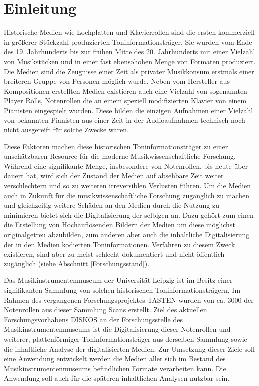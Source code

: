 \section{Einleitung}

Historische Medien wie Lochplatten und Klavierrollen sind die ersten kommerziell in größerer Stückzahl produzierten Toninformationsträger.
Sie wurden vom Ende des 19. Jahrhunderts bis zur frühen Mitte des 20. Jahrhunderts mit einer Vielzahl von Musikstücken und in einer fast ebensohohen Menge von Formaten produziert.
Die Medien sind die Zeugnisse einer Zeit als privater Musikkonsum erstmals einer breiteren Gruppe von Personen möglich wurde.
Neben vom Hersteller aus Kompositionen erstellten Medien existieren auch eine Vielzahl von sogenannten Player Rolls, Notenrollen die an einem speziell modifizierten Klavier von einem Pianisten eingespielt wurden.
Diese bilden die einzigen Aufnahmen einer Vielzahl von bekannten Pianisten aus einer Zeit in der Audioaufnahmen technisch noch nicht ausgereift für solche Zwecke waren.

Diese Faktoren machen diese historischen Toninformationsträger zu einer unschätzbaren Resource für die moderne Musikwissenschaftliche Forschung.\\
Während eine signifikante Menge, insbesondere von Notenrollen, bis heute über-dauert hat, wird sich der Zustand der Medien auf 
absehbare Zeit weiter verschlechtern und so zu weiteren irreversiblen Verlusten führen.
Um die Medien auch in Zukunft für die musikwissenschaftliche Forschung zugänglich zu machen und gleichzeitig weitere Schäden an den Medien durch die Nutzung zu minimieren bietet sich die Digitalisierung der selbigen an.
Dazu gehört zum einen die Erstellung von Hochauflösenden Bildern der Medien um diese möglichst originalgetreu abzubilden, zum anderen aber auch die inhaltliche Digitalisierung der in den Medien kodierten Toninformationen.
Verfahren zu diesem Zweck existieren, sind aber zu meist schlecht dokumentiert und nicht öffentlich zugänglich (siehe Abschnitt \ref{Forschungsstand}).

Das Musikinstrumentenmuseum der Universität Leipzig ist im Besitz einer signifikanten Sammlung von solchen historischen Toninformationsträgern.
Im Rahmen des vergangenen Forschungsprojektes TASTEN wurden von ca. 3000 der Notenrollen aus dieser Sammlung Scans erstellt.
Ziel des aktuellen Forschungsvorhabens DISKOS an der Forschungsstelle des Musikinstrumentenmuseums ist die Digitalisierung dieser Notenrollen und weiterer, plattenförmiger Toninformationsträger aus derselben Sammlung sowie die inhaltliche Analyse der digitalisierten Medien.
Zur Umsetzung dieser Ziele soll eine Anwendung entwickelt werden die Medien aller sich im Bestand des Musikinstrumentenmuseums befindlichen Formate verarbeiten kann.
Die Anwendung soll auch für die späteren inhaltlichen Analysen nutzbar sein.

